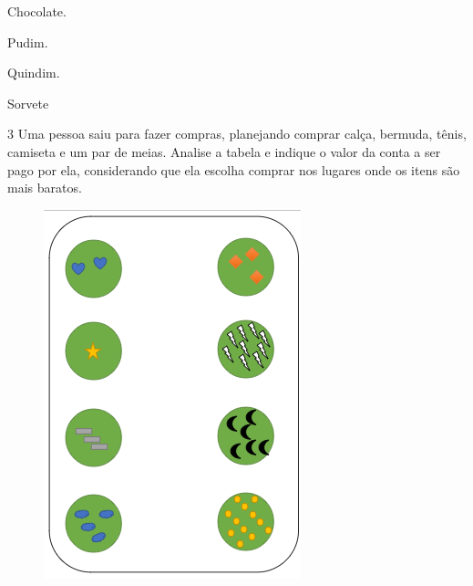 \begin{minipage}{.5\textwidth}
\begin{escolha}
\item Chocolate.

\item Pudim.

\item Quindim.

\item Sorvete
\end{escolha}
\end{minipage}

\pagebreak
\num{3} Uma pessoa saiu para fazer compras, planejando comprar calça, bermuda, tênis, camiseta e um par de meias. Analise a tabela e indique o valor da conta a ser pago por ela, considerando que ela escolha comprar nos lugares onde os
itens são mais baratos.

\begin{figure}[htpb!]
\includegraphics[width=\textwidth]{./media/image102.png}
\end{figure}

